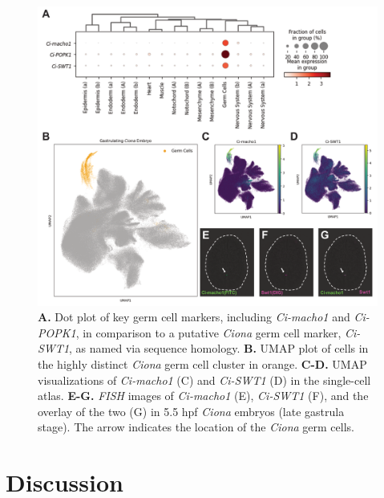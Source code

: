 \begin{figure}[p]
    \centering
    \includegraphics[scale=.7]{4_figures-and-files/Fig4_Swt1-Germ-Cell-Markers.png}
    \caption[Discovery of \textit{SWT1} found in the \textit{Ciona} germ cell cluster]{\textbf{A.} Dot plot of key germ cell markers, including \textit{Ci-macho1} and \textit{Ci-POPK1}, in comparison to a putative \textit{Ciona} germ cell marker, \textit{Ci-SWT1}, as named via sequence homology. \textbf{B.} UMAP plot of cells in the highly distinct \textit{Ciona} germ cell cluster in orange. \textbf{C-D.} UMAP visualizations of \textit{Ci-macho1} (C) and \textit{Ci-SWT1} (D) in the single-cell atlas. \textbf{E-G.} \textit{FISH} images of \textit{Ci-macho1} (E), \textit{Ci-SWT1} (F), and the overlay of the two (G) in 5.5 hpf \textit{Ciona} embryos (late gastrula stage). The arrow indicates the location of the \textit{Ciona} germ cells.}
    \label{fig:4 single cell germ cell markers}
\end{figure}

\section{Discussion}

